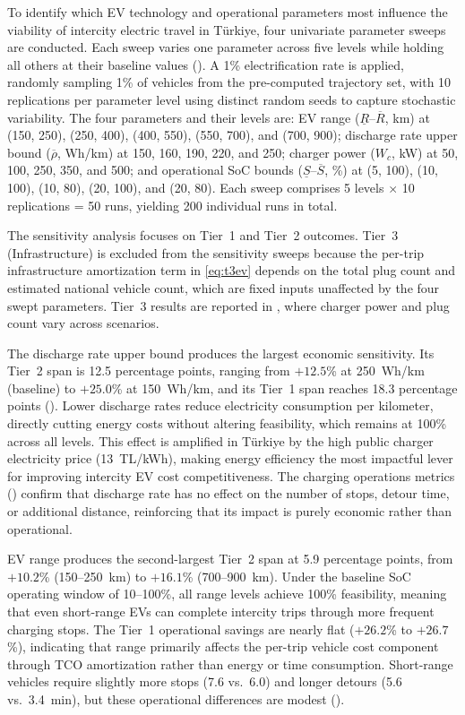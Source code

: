 To identify which EV technology and operational parameters most influence the viability of intercity electric travel in T\"{u}rkiye, four univariate parameter sweeps are conducted. Each sweep varies one parameter across five levels while holding all others at their baseline values (). A 1\% electrification rate is applied, randomly sampling 1\% of vehicles from the pre-computed trajectory set, with 10 replications per parameter level using distinct random seeds to capture stochastic variability. The four parameters and their levels are: EV range ($\underline{R}$--$\overline{R}$, km) at (150, 250), (250, 400), (400, 550), (550, 700), and (700, 900); discharge rate upper bound ($\overline{\rho}$, Wh/km) at 150, 160, 190, 220, and 250; charger power ($W_c$, kW) at 50, 100, 250, 350, and 500; and operational SoC bounds ($\underline{S}$--$\overline{S}$, \%) at (5, 100), (10, 100), (10, 80), (20, 100), and (20, 80). Each sweep comprises 5 levels $\times$ 10 replications = 50 runs, yielding 200 individual runs in total.

The sensitivity analysis focuses on Tier~1 and Tier~2 outcomes. Tier~3 (Infrastructure) is excluded from the sensitivity sweeps because the per-trip infrastructure amortization term in \eqref{eq:t3ev} depends on the total plug count and estimated national vehicle count, which are fixed inputs unaffected by the four swept parameters. Tier~3 results are reported in , where charger power and plug count vary across scenarios.

The discharge rate upper bound produces the largest economic sensitivity. Its Tier~2 span is 12.5 percentage points, ranging from $+12.5$\% at 250~Wh/km (baseline) to $+25.0$\% at 150~Wh/km, and its Tier~1 span reaches 18.3 percentage points (). Lower discharge rates reduce electricity consumption per kilometer, directly cutting energy costs without altering feasibility, which remains at 100\% across all levels. This effect is amplified in T\"{u}rkiye by the high public charger electricity price (13~TL/kWh), making energy efficiency the most impactful lever for improving intercity EV cost competitiveness. The charging operations metrics () confirm that discharge rate has no effect on the number of stops, detour time, or additional distance, reinforcing that its impact is purely economic rather than operational.

EV range produces the second-largest Tier~2 span at 5.9 percentage points, from $+10.2$\% (150--250~km) to $+16.1$\% (700--900~km). Under the baseline SoC operating window of 10--100\%, all range levels achieve 100\% feasibility, meaning that even short-range EVs can complete intercity trips through more frequent charging stops. The Tier~1 operational savings are nearly flat ($+26.2$\% to $+26.7$\%), indicating that range primarily affects the per-trip vehicle cost component through TCO amortization rather than energy or time consumption. Short-range vehicles require slightly more stops (7.6 vs.\ 6.0) and longer detours (5.6 vs.\ 3.4~min), but these operational differences are modest ().

